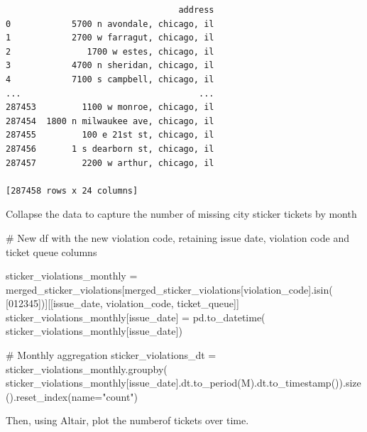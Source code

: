 \documentclass[
  letterpaper,
  DIV=11,
  numbers=noendperiod]{scrartcl}
\newenvironment{Shaded}{\begin{snugshade}}{\end{snugshade}}
\newcommand{\CommentTok}[1]{\textcolor[rgb]{0.37,0.37,0.37}{#1}}
\newcommand{\NormalTok}[1]{\textcolor[rgb]{0.00,0.23,0.31}{#1}}
\newcommand{\OperatorTok}[1]{\textcolor[rgb]{0.37,0.37,0.37}{#1}}
\newcommand{\StringTok}[1]{\textcolor[rgb]{0.13,0.47,0.30}{#1}}
\begin{document}
\begin{verbatim}
                                  address  
0            5700 n avondale, chicago, il  
1            2700 w farragut, chicago, il  
2               1700 w estes, chicago, il  
3            4700 n sheridan, chicago, il  
4            7100 s campbell, chicago, il  
...                                   ...  
287453         1100 w monroe, chicago, il  
287454  1800 n milwaukee ave, chicago, il  
287455         100 e 21st st, chicago, il  
287456       1 s dearborn st, chicago, il  
287457         2200 w arthur, chicago, il  

[287458 rows x 24 columns]
\end{verbatim}

Collapse the data to capture the number of missing city sticker tickets
by month

\begin{Shaded}
\begin{Highlighting}[]
\CommentTok{\# New df with the new violation code, retaining issue date, violation code and ticket queue columns}

\NormalTok{sticker\_violations\_monthly }\OperatorTok{=}\NormalTok{ merged\_sticker\_violations[merged\_sticker\_violations[}\StringTok{\textquotesingle{}violation\_code\textquotesingle{}}\NormalTok{].isin(}
\NormalTok{    [}\StringTok{\textquotesingle{}012345\textquotesingle{}}\NormalTok{])][[}\StringTok{\textquotesingle{}issue\_date\textquotesingle{}}\NormalTok{, }\StringTok{\textquotesingle{}violation\_code\textquotesingle{}}\NormalTok{, }\StringTok{\textquotesingle{}ticket\_queue\textquotesingle{}}\NormalTok{]]}
\NormalTok{sticker\_violations\_monthly[}\StringTok{\textquotesingle{}issue\_date\textquotesingle{}}\NormalTok{] }\OperatorTok{=}\NormalTok{ pd.to\_datetime(}
\NormalTok{    sticker\_violations\_monthly[}\StringTok{\textquotesingle{}issue\_date\textquotesingle{}}\NormalTok{])}

\CommentTok{\# Monthly aggregation}
\NormalTok{sticker\_violations\_dt }\OperatorTok{=}\NormalTok{ sticker\_violations\_monthly.groupby(}
\NormalTok{    sticker\_violations\_monthly[}\StringTok{\textquotesingle{}issue\_date\textquotesingle{}}\NormalTok{].dt.to\_period(}\StringTok{\textquotesingle{}M\textquotesingle{}}\NormalTok{).dt.to\_timestamp()).size().reset\_index(name}\OperatorTok{=}\StringTok{"count"}\NormalTok{)}
\end{Highlighting}
\end{Shaded}

Then, using Altair, plot the numberof tickets over time.
\end{document}
